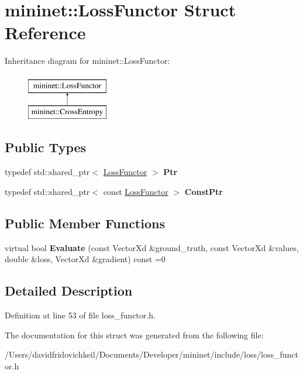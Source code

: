 \hypertarget{structmininet_1_1_loss_functor}{}\section{mininet\+:\+:Loss\+Functor Struct Reference}
\label{structmininet_1_1_loss_functor}
Inheritance diagram for mininet\+:\+:Loss\+Functor\+:\begin{figure}[H]
\begin{center}
\leavevmode
\includegraphics[height=2.000000cm]{structmininet_1_1_loss_functor}
\end{center}
\end{figure}
\subsection*{Public Types}
\begin{DoxyCompactItemize}
\item 
\hypertarget{structmininet_1_1_loss_functor_a83844446699ed7e2acd3ded37dcdea30}{}\label{structmininet_1_1_loss_functor_a83844446699ed7e2acd3ded37dcdea30} 
typedef std\+::shared\+\_\+ptr$<$ \hyperlink{structmininet_1_1_loss_functor}{Loss\+Functor} $>$ {\bfseries Ptr}
\item 
\hypertarget{structmininet_1_1_loss_functor_a364ddba572476df7162f90d0b1f3edc0}{}\label{structmininet_1_1_loss_functor_a364ddba572476df7162f90d0b1f3edc0} 
typedef std\+::shared\+\_\+ptr$<$ const \hyperlink{structmininet_1_1_loss_functor}{Loss\+Functor} $>$ {\bfseries Const\+Ptr}
\end{DoxyCompactItemize}
\subsection*{Public Member Functions}
\begin{DoxyCompactItemize}
\item 
\hypertarget{structmininet_1_1_loss_functor_ae802e879737d401de2b08acabe976eb8}{}\label{structmininet_1_1_loss_functor_ae802e879737d401de2b08acabe976eb8} 
virtual bool {\bfseries Evaluate} (const Vector\+Xd \&ground\+\_\+truth, const Vector\+Xd \&values, double \&loss, Vector\+Xd \&gradient) const =0
\end{DoxyCompactItemize}


\subsection{Detailed Description}


Definition at line 53 of file loss\+\_\+functor.\+h.



The documentation for this struct was generated from the following file\+:\begin{DoxyCompactItemize}
\item 
/\+Users/davidfridovichkeil/\+Documents/\+Developer/mininet/include/loss/loss\+\_\+functor.\+h\end{DoxyCompactItemize}
